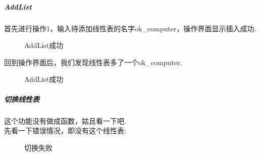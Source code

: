 \documentclass[supercite]{Experimental_Report}
\theoremstyle{definition}
\begin{document}
\subparagraph{AddList}
\noindent
首先进行操作1，输入待添加线性表的名字ok\_computer，操作界面显示插入成功.
\begin{figure}[htbp]
	\centering
	\centering
	\caption{AddList成功}
	\label{fig2-2}
\end{figure}

\noindent
回到操作界面后，我们发现线性表多了一个ok\_computer.
\begin{figure}[htbp]
	\centering
	\centering
	\caption{AddList成功}
	\label{fig2-3}
\end{figure}

\clearpage
\subparagraph{切换线性表}
\noindent
这个功能没有做成函数，姑且看一下吧.\\
先看一下错误情况，即没有这个线性表:
\begin{figure}[htbp]
	\centering
	\centering
	\caption{切换失败}
	\label{fig2-4}
\end{figure}
\end{document}
